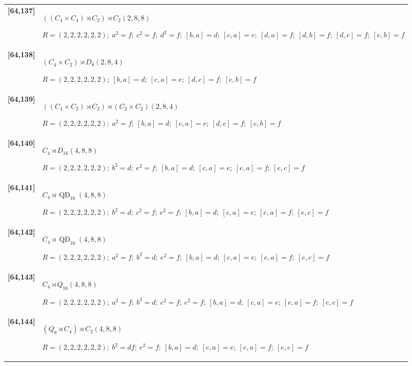 \documentclass[UTF8,fontset=fandol,11pt,a4paper]{ctexart}
\begin{document}
\begin{longtable}{@{}p{17mm}>{\raggedright\arraybackslash}p{141mm}@{}}
\textbf{[64,137]} & $((C_{4}\times C_{4})\rtimes C_{2})\rtimes C_{2}$\quad $(2,8,8)$\par\(R=(2,2,2,2,2,2);\allowbreak\ a^{2}=f;\allowbreak\ c^{2}=f;\allowbreak\ d^{2}=f;\allowbreak\ [b,a]=d;\allowbreak\ [c,a]=e;\allowbreak\ [d,a]=f;\allowbreak\ [d,b]=f;\allowbreak\ [d,c]=f;\allowbreak\ [e,b]=f\)\\[3pt]

\textbf{[64,138]} & $(C_{4}\times C_{2})\rtimes D_{8}$\quad $(2,8,4)$\par\(R=(2,2,2,2,2,2);\allowbreak\ [b,a]=d;\allowbreak\ [c,a]=e;\allowbreak\ [d,c]=f;\allowbreak\ [e,b]=f\)\\[3pt]

\textbf{[64,139]} & $((C_{4}\times C_{2})\rtimes C_{2})\rtimes (C_{2}\times C_{2})$\quad $(2,8,4)$\par\(R=(2,2,2,2,2,2);\allowbreak\ a^{2}=f;\allowbreak\ [b,a]=d;\allowbreak\ [c,a]=e;\allowbreak\ [d,c]=f;\allowbreak\ [e,b]=f\)\\[3pt]

\textbf{[64,140]} & $C_{4}\rtimes D_{16}$\quad $(4,8,8)$\par\(R=(2,2,2,2,2,2);\allowbreak\ b^{2}=d;\allowbreak\ e^{2}=f;\allowbreak\ [b,a]=d;\allowbreak\ [c,a]=e;\allowbreak\ [e,a]=f;\allowbreak\ [e,c]=f\)\\[3pt]

\textbf{[64,141]} & $C_{4}\rtimes \operatorname{QD}_{16}$\quad $(4,8,8)$\par\(R=(2,2,2,2,2,2);\allowbreak\ b^{2}=d;\allowbreak\ c^{2}=f;\allowbreak\ e^{2}=f;\allowbreak\ [b,a]=d;\allowbreak\ [c,a]=e;\allowbreak\ [e,a]=f;\allowbreak\ [e,c]=f\)\\[3pt]

\textbf{[64,142]} & $C_{4}\rtimes \operatorname{QD}_{16}$\quad $(4,8,8)$\par\(R=(2,2,2,2,2,2);\allowbreak\ a^{2}=f;\allowbreak\ b^{2}=d;\allowbreak\ e^{2}=f;\allowbreak\ [b,a]=d;\allowbreak\ [c,a]=e;\allowbreak\ [e,a]=f;\allowbreak\ [e,c]=f\)\\[3pt]

\textbf{[64,143]} & $C_{4}\rtimes Q_{16}$\quad $(4,8,8)$\par\(R=(2,2,2,2,2,2);\allowbreak\ a^{2}=f;\allowbreak\ b^{2}=d;\allowbreak\ c^{2}=f;\allowbreak\ e^{2}=f;\allowbreak\ [b,a]=d;\allowbreak\ [c,a]=e;\allowbreak\ [e,a]=f;\allowbreak\ [e,c]=f\)\\[3pt]

\textbf{[64,144]} & $(Q_{8}\rtimes C_{4})\rtimes C_{2}$\quad $(4,8,8)$\par\(R=(2,2,2,2,2,2);\allowbreak\ b^{2}=df;\allowbreak\ e^{2}=f;\allowbreak\ [b,a]=d;\allowbreak\ [c,a]=e;\allowbreak\ [e,a]=f;\allowbreak\ [e,c]=f\)\\[3pt]


\end{longtable}
\end{document}
